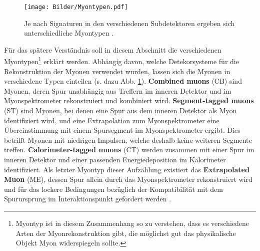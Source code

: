 %
\begin{figure}[htbp]                                 
  \begin{center}                                       
  \texttt{[image: Bilder/Myontypen.pdf]} 
   \caption[Verschiedene Myontypen, die sich bei der Spurrekonstruktion bei ATLAS ergeben können]{Je nach Signaturen in den verschiedenen Subdetektoren ergeben sich unterschiedliche Myontypen \cite{Verena}.}
   \label{Myontypen}                                     
   \end{center}
\end{figure}
Für das spätere Verständnis soll in diesem Abschnitt die verschiedenen Myontypen\footnote{Myontyp ist in diesem Zusammenhang so zu verstehen, dass es verschiedene Arten der Myonrekonstruktion gibt, die möglichst gut das physikalische Objekt Myon widerspiegeln sollte.} erklärt werden. Abhängig davon, welche Detekorsysteme für die Rekonstruktion der Myonen verwendet wurden, lassen sich die Myonen in verschiedene Typen einteilen (s. dazu Abb. \ref{Myontypen}).
\textbf{Combined muons} (CB) sind Myonen, deren Spur unabhängig aus Treffern im inneren Detektor und im Myonspektrometer re\-kon\-stru\-iert und kombiniert wird. \textbf{Segment-tagged muons} (ST) sind Myonen, bei denen eine Spur aus dem inneren Detektor als Myon identifiziert wird, und eine Extrapolation zum Myonspektrometer eine Übereinstimmung mit einem Spursegment im Myonspektrometer ergibt. Dies betrifft Myonen mit niedrigen Impulsen, welche deshalb keine weiteren Segmente treffen. \textbf{Calorimeter-tagged muons} (CT) werden zusammen mit einer Spur im inneren Detektor und einer passenden Energiedeposition im Kalorimeter identifiziert. Als letzter Myontyp dieser Aufzählung existiert das \textbf{Extrapolated Muon} (ME), dessen Spur allein durch das Myonspektrometer rekonstruiert wird und für das lockere Bedingungen bezüglich der Kompatibilität mit dem Spurursprung im Interaktionspunkt gefordert werden \cite{MuPerNeu}.
% 
%
%
